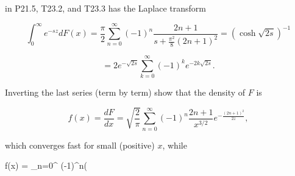 in P21.5, T23.2, and T23.3 has the Laplace transform

$$\int_0^\infty e^{-sz} dF(x) = \frac{\pi}{2} \sum_{n=0}^{\infty} (-1)^n \frac{2n+1}{s + \frac{\pi^2}{8}(2n+1)^2} = (\cosh \sqrt{2s})^{-1}$$

$$= 2e^{-\sqrt{2s}} \sum_{k=0}^{\infty} (-1)^k e^{-2k\sqrt{2s}}.$$

Inverting the last series (term by term) show that the density of $F$ is

$$f(x) = \frac{dF}{dx} = \sqrt{\frac{2}{\pi}} \sum_{n=0}^{\infty} (-1)^n \frac{2n+1}{x^{3/2}} e^{-\frac{(2n+1)^2}{2z}},$$

which converges fast for small (positive) $x$, while

$$f(x) =  \sum_{n=0}^{\infty} (-1)^n(